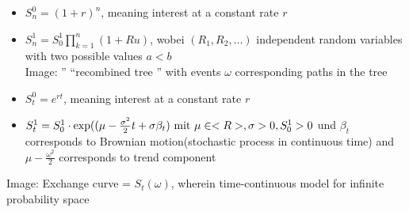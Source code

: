 \begin{*example}
	\begin{itemize}
		\item $S^0_n = (1+r)^n$, meaning interest at a constant rate $r$
		\item $S^1_n = S_0^1 \prod_{k=1}^n(1+Ru)$, wobei $(R_1, R_2, \dots)$ independent random variables with two possible values $a < b$\\
		Image: '' ``recombined tree '' with events $\omega$ corresponding paths in the tree
	\end{itemize}
\end{*example}
\begin{*example}
	\begin{itemize}
		\item $S^0_t = e^{rt}$, meaning interest at a constant rate $r$
		\item $S_t^1 = S_0^1\cdot \exp((\mu - \frac{\sigma^2}{2}t + \sigma\beta_t) \text{ mit } \mu \in <R>, \sigma > 0, S^1_0 >0$ und $\beta_t$ 
		corresponds to Brownian motion(stochastic process in continuous time) and $\mu - \frac{\omega^2}{2}$ corresponds to trend component
	\end{itemize}
	Image: Exchange curve = $S_t(\omega)$, wherein time-continuous model for infinite probability space
\end{*example}
